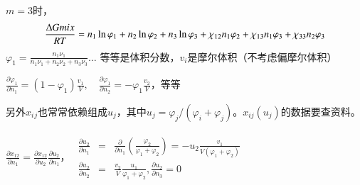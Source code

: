 \documentclass{article} %
\begin{document}
\noindent $m=3$时，
\[\frac{{\rm \Delta }Gmix}{RT} =n_{1} \ln \varphi _{1} +n_{2} \ln \varphi _{2} +n_{3} \ln \varphi _{3} +\chi _{12} n_{1} \varphi _{2} +\chi _{13} n_{1} \varphi _{3} +\chi _{33} n_{2} \varphi _{3} \] 
$\varphi _{1} =\frac{n_{1} \nu _{1} }{n_{1} \nu _{1} +n_{2} \nu _{2} +n_{3} \nu _{3} } \ldots $ 等等是体积分数，$v_{i} $是摩尔体积（不考虑偏摩尔体积）

\noindent $\frac{\partial \varphi _{1} }{\partial n_{1} } =(1-\varphi _{1} )\frac{v_{1} }{V} ,\quad \frac{\partial \varphi _{1} }{\partial n_{2} } =-\varphi _{1} \frac{v_{2} }{V} $，等等

\noindent 另外$x_{i} {}_{j} $也常常依赖组成$u_{j} $，其中$u_{j} =\varphi _{j} /(\varphi _{i} +\varphi _{j} )$。$x_{ij} (u_{j} )$的数据要查资料。

\noindent $\frac{\partial x_{12} }{\partial n_{1} } =\frac{\partial x_{12} }{\partial u_{2} } \frac{\partial u_{2} }{\partial n_{1} } $，$\begin{array}{c} {\begin{array}{rcl} {\frac{\partial u_{2} }{\partial n_{1} } } & {=} & {\frac{\partial }{\partial n_{1} } \left(\frac{\varphi _{2} }{\varphi _{1} +\varphi _{2} } \right)=-u_{2} \frac{v_{1} }{V(\varphi _{1} +\varphi _{2} )} } \\ {\frac{\partial u_{2} }{\partial n_{2} } } & {=} & {\frac{v_{2} }{V} \frac{u_{1} }{\varphi _{1} +\varphi _{2} } ,\frac{\partial u_{2} }{\partial n_{3} } =0} \end{array}} \end{array}$ 
\end{document}

